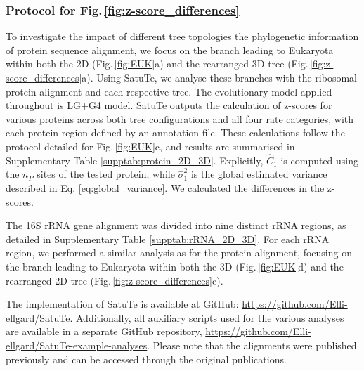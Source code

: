 \bigskip

\subsubsection*{Protocol for Fig.\,\ref{fig:z-score_differences}}

To investigate the impact of different tree topologies the phylogenetic information of protein sequence alignment, we focus on the branch leading to Eukaryota within both the 2D (Fig.\,\ref{fig:EUK}a) and the rearranged 3D tree (Fig.\,\ref{fig:z-score_differences}a). Using SatuTe, we analyse these branches with the ribosomal protein alignment and each respective tree. The evolutionary model applied throughout is LG+G4 model. SatuTe outputs the calculation of z-scores for various proteins across both tree configurations and all four rate categories, with each protein region defined by an annotation file. These calculations follow the protocol detailed for Fig.\,\ref{fig:EUK}c, and results are summarised in Supplementary Table \ref{supptab:protein_2D_3D}. Explicitly,  $\hat{C}_1$ is computed using the $n_P$ sites of the tested protein, while $\hat\sigma^2_1$ is the global estimated variance described in Eq. \eqref{eq:global_variance}. We calculated the differences in the z-scores. 

\medskip

The 16S rRNA gene alignment was divided into nine distinct rRNA regions, as detailed in Supplementary Table \ref{supptab:rRNA_2D_3D}. For each rRNA region, we performed a similar analysis as for the protein alignment, focusing on the branch leading to Eukaryota within both the 3D (Fig.\,\ref{fig:EUK}d) and the rearranged 2D tree (Fig.\,\ref{fig:z-score_differences}c).

\bigskip


 The implementation of SatuTe is available at GitHub: \url{https://github.com/Elli-ellgard/SatuTe}. Additionally, all auxiliary scripts used for the various analyses are available in a separate GitHub repository, \url{https://github.com/Elli-ellgard/SatuTe-example-analyses}. Please note that the alignments were published previously and can be accessed through the original publications.



\vspace{0.25cm}

